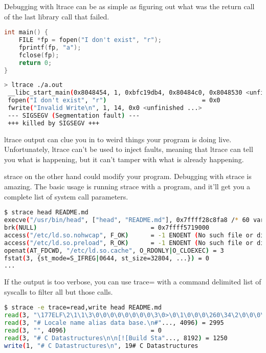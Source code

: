 Debugging with ltrace can be as simple as figuring out what was the return call of the last library call that failed.

\begin{lstlisting}[language=C]
int main() {
    FILE *fp = fopen("I don't exist", "r");
    fprintf(fp, "a");
    fclose(fp);
    return 0;
}
\end{lstlisting}

\begin{lstlisting}[language=bash]
> ltrace ./a.out
 __libc_start_main(0x8048454, 1, 0xbfc19db4, 0x80484c0, 0x8048530 <unfinished ...>
 fopen("I don't exist", "r")                          = 0x0
 fwrite("Invalid Write\n", 1, 14, 0x0 <unfinished ...>
 --- SIGSEGV (Segmentation fault) ---
 +++ killed by SIGSEGV +++

\end{lstlisting}

ltrace output can clue you in to weird things your program is doing live.
Unfortunately, ltrace can’t be used to inject faults, meaning that ltrace can tell you what is happening, but it can't tamper with what is already happening.

strace on the other hand could modify your program.
Debugging with strace is amazing.
The basic usage is running strace with a program, and it’ll get you a complete list of system call parameters.

\begin{lstlisting}[language=bash]
$ strace head README.md
execve("/usr/bin/head", ["head", "README.md"], 0x7ffff28c8fa8 /* 60 vars */) = 0
brk(NULL)                               = 0x7ffff5719000
access("/etc/ld.so.nohwcap", F_OK)      = -1 ENOENT (No such file or directory)
access("/etc/ld.so.preload", R_OK)      = -1 ENOENT (No such file or directory)
openat(AT_FDCWD, "/etc/ld.so.cache", O_RDONLY|O_CLOEXEC) = 3
fstat(3, {st_mode=S_IFREG|0644, st_size=32804, ...}) = 0
...
\end{lstlisting}

If the output is too verbose, you can use trace= with a command delimited list of syscalls to filter all but those calls.

\begin{lstlisting}[language=bash]
$ strace -e trace=read,write head README.md
read(3, "\177ELF\2\1\1\3\0\0\0\0\0\0\0\0\3\0>\0\1\0\0\0\260\34\2\0\0\0\0\0"..., 832) = 832
read(3, "# Locale name alias data base.\n#"..., 4096) = 2995
read(3, "", 4096)                       = 0
read(3, "# C Datastructures\n\n[![Build Sta"..., 8192) = 1250
write(1, "# C Datastructures\n", 19# C Datastructures
\end{lstlisting}

